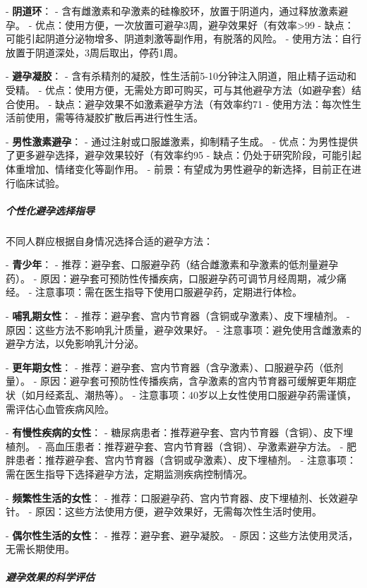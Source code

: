 \begin{enumerate}
- \textbf{阴道环}：
  - 含有雌激素和孕激素的硅橡胶环，放置于阴道内，通过释放激素避孕。
  - 优点：使用方便，一次放置可避孕3周，避孕效果好（有效率>99%
  - 缺点：可能引起阴道分泌物增多、阴道刺激等副作用，有脱落的风险。
  - 使用方法：自行放置于阴道深处，3周后取出，停药1周。

- \textbf{避孕凝胶}：
  - 含有杀精剂的凝胶，性生活前5-10分钟注入阴道，阻止精子运动和受精。
  - 优点：使用方便，无需处方即可购买，可与其他避孕方法（如避孕套）结合使用。
  - 缺点：避孕效果不如激素避孕方法（有效率约71%
  - 使用方法：每次性生活前使用，需等待凝胶扩散后再进行性生活。

- \textbf{男性激素避孕}：
  - 通过注射或口服雄激素，抑制精子生成。
  - 优点：为男性提供了更多避孕选择，避孕效果较好（有效率约95%
  - 缺点：仍处于研究阶段，可能引起体重增加、情绪变化等副作用。
  - 前景：有望成为男性避孕的新选择，目前正在进行临床试验。

\subparagraph{个性化避孕选择指导}

不同人群应根据自身情况选择合适的避孕方法：

- \textbf{青少年}：
  - 推荐：避孕套、口服避孕药（结合雌激素和孕激素的低剂量避孕药）。
  - 原因：避孕套可预防性传播疾病，口服避孕药可调节月经周期，减少痛经。
  - 注意事项：需在医生指导下使用口服避孕药，定期进行体检。

- \textbf{哺乳期女性}：
  - 推荐：避孕套、宫内节育器（含铜或孕激素）、皮下埋植剂。
  - 原因：这些方法不影响乳汁质量，避孕效果好。
  - 注意事项：避免使用含雌激素的避孕方法，以免影响乳汁分泌。

- \textbf{更年期女性}：
  - 推荐：避孕套、宫内节育器（含孕激素）、口服避孕药（低剂量）。
  - 原因：避孕套可预防性传播疾病，含孕激素的宫内节育器可缓解更年期症状（如月经紊乱、潮热等）。
  - 注意事项：40岁以上女性使用口服避孕药需谨慎，需评估心血管疾病风险。

- \textbf{有慢性疾病的女性}：
  - 糖尿病患者：推荐避孕套、宫内节育器（含铜）、皮下埋植剂。
  - 高血压患者：推荐避孕套、宫内节育器（含铜）、孕激素避孕方法。
  - 肥胖患者：推荐避孕套、宫内节育器（含铜或孕激素）、皮下埋植剂。
  - 注意事项：需在医生指导下选择避孕方法，定期监测疾病控制情况。

- \textbf{频繁性生活的女性}：
  - 推荐：口服避孕药、宫内节育器、皮下埋植剂、长效避孕针。
  - 原因：这些方法使用方便，避孕效果好，无需每次性生活时使用。

- \textbf{偶尔性生活的女性}：
  - 推荐：避孕套、避孕凝胶。
  - 原因：这些方法使用灵活，无需长期使用。

\subparagraph{避孕效果的科学评估}


\end{enumerate}
